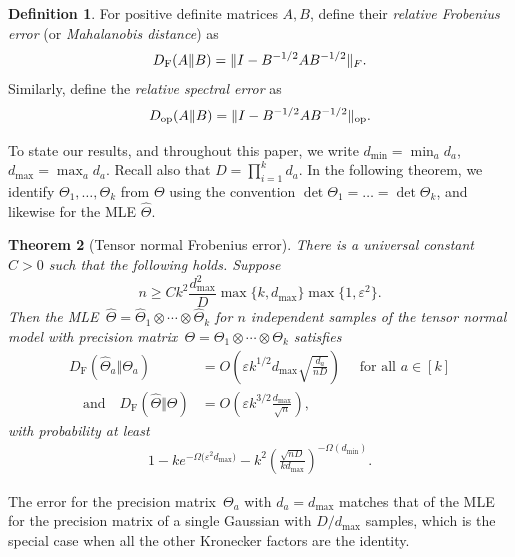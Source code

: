 \documentclass[aos]{imsart}
\newtheorem{theorem}{Theorem}[section]
\theoremstyle{definition}
\newtheorem{definition}[theorem]{Definition}
\numberwithin{equation}{section}
\DeclareMathOperator{\op}{op}
\DeclarePairedDelimiter{\norm}{\lVert}{\rVert}
\newcommand{\htheta}{\widehat{\Theta}}
\newcommand{\ot}{\otimes}
\newcommand{\eps}{\varepsilon}
\newcommand{\DF}{D_{\operatorname{F}}}
\newcommand{\Dop}{D_{\operatorname{op}}}
\def\dmax{d_{\max}}
\begin{document}
\begin{definition}
For positive definite matrices $A, B$, define their \emph{relative Frobenius error} (or \emph{Mahalanobis distance}) as
\begin{align}\label{eq:def D_F}
  \DF(A \Vert B) = \norm{I - B^{-1/2} A B^{-1/2}}_F.
\end{align}
Similarly, define the \emph{relative spectral error} as
\begin{align}\label{eq:def D_op}
  \Dop(A \Vert B) = \norm{I - B^{-1/2} A B^{-1/2}}_{\op}.
\end{align}
\end{definition}

To state our results, and throughout this paper, we write $d_{\min} = \min_a d_a$, $\dmax = \max_a d_a$.
Recall also that $D = \prod_{i=1}^k d_a$.
In the following theorem, we identify $\Theta_1,\dots,\Theta_k$ from $\Theta$ using the convention $\det\Theta_1=\dots=\det\Theta_k$, and likewise for the MLE $\htheta$.
\newcommand{\TensorFrob}[2]{%
There is a universal constant~$C>0$ such that the following holds.
Suppose
\begin{#1}#2
  n \geq C k^2 \frac{\dmax^2}{D} \max\{k, \dmax\} \max\{1 , \eps^2\}.
\end{#1}
Then the MLE~$\htheta = \htheta_1 \ot \cdots \ot \htheta_k$ for $n$ independent samples of the tensor normal model with precision matrix~$\Theta = \Theta_1 \ot \cdots \ot \Theta_k$ satisfies
\begin{align*}
  \DF(\htheta_a\Vert\Theta_a) &= O\left(\eps k^{1/2} \dmax \sqrt{\frac{d_a}{n D}} \right) \quad\text{ for all } a\in[k] \\
\quad\text{and}\quad
  \DF(\htheta\Vert\Theta) &= O\left(\eps k^{3/2} \frac{\dmax}{\sqrt{n}}\right),
\end{align*}
with probability at least
\begin{align*}
  1 - k e^{-\Omega\bigl( \eps^2 \dmax \bigr)} - k^2 \left( \frac{\sqrt{nD}}{k \dmax} \right)^{-\Omega(d_{\min})}.
\end{align*}}

\begin{theorem}[Tensor normal Frobenius error]\label{thm:tensor-frobenius}
\TensorFrob{equation}{\label{eq:eps sqr assm}}
\end{theorem}

The error for the precision matrix~$\Theta_a$ with $d_a = \dmax$ matches that of the MLE for the precision matrix of a single Gaussian with $D/\dmax$ samples, which is the special case when all the other Kronecker factors are the identity.
\end{document}

